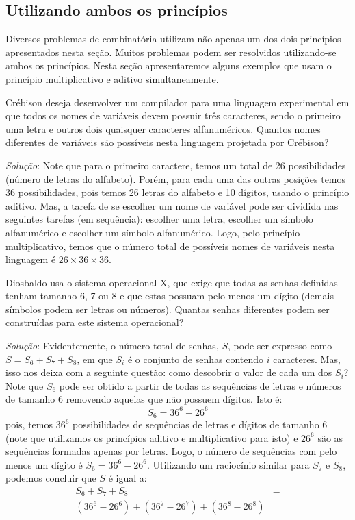 \subsection{Utilizando ambos os princípios}

Diversos problemas de combinatória utilizam não apenas um dos dois
princípios apresentados nesta seção. Muitos problemas podem ser
resolvidos utilizando-se ambos os princípios. Nesta seção
apresentaremos alguns exemplos que usam o princípio multiplicativo e
aditivo simultaneamente.

\begin{Example}
Crébison deseja desenvolver um compilador para uma linguagem
experimental em que todos os nomes de variáveis devem possuir três
caracteres, sendo o primeiro uma letra e outros dois quaisquer
caracteres alfanuméricos. Quantos nomes diferentes de variáveis são
possíveis nesta linguagem projetada por Crébison?

\textit{Solução}: Note que para o primeiro caractere, temos um total
de 26 possibilidades (número de letras do alfabeto). Porém, para cada
uma das outras posições temos 36 possibilidades, pois temos 26 letras do alfabeto
e 10 dígitos, usando o princípio aditivo. Mas, a tarefa de se escolher
um nome de variável pode ser dividida nas seguintes tarefas (em
sequência): escolher uma letra, escolher um símbolo alfanumérico e
escolher um símbolo alfanumérico. Logo, pelo princípio multiplicativo,
temos que o número total de possíveis nomes de variáveis nesta
linguagem é $26 \times 36 \times 36$.
\end{Example}

\begin{Example}
Diosbaldo usa o sistema operacional X, que exige que todas as senhas
definidas tenham tamanho 6, 7 ou 8 e que estas possuam pelo menos um
dígito (demais símbolos podem ser letras ou números). Quantas senhas
diferentes podem ser construídas para este sistema operacional?

\textit{Solução}: Evidentemente, o número total de senhas, $S$, pode
ser expresso como $S = S_6 + S_7 + S_8$, em que $S_i$ é o conjunto de
senhas contendo $i$ caracteres. Mas, isso nos deixa com a seguinte
questão: como descobrir o valor de cada um dos $S_i$? Note que $S_6$
pode ser obtido a partir de todas as sequências de letras e números de
tamanho 6 removendo aquelas que não possuem dígitos. Isto é:
\[S_6 = 36^6 - 26^6\]
pois, temos $36^6$ possibilidades de sequências de letras e dígitos de
tamanho 6 (note que utilizamos os princípios aditivo e multiplicativo
para isto) e $26^6$ são as sequências formadas apenas por
letras. Logo,  o número de sequências com pelo menos um dígito é
$S_6 = 36^6 - 26^6$. Utilizando um raciocínio similar para $S_7$ e
$S_8$, podemos concluir que $S$ é igual a:
\[
\begin{array}{lc}
S_6 + S_7 + S_8 & =\\
(36^6 - 26^6) + (36^7 - 26^7) + (36^8 - 26^8)
\end{array}
\]
\end{Example}

